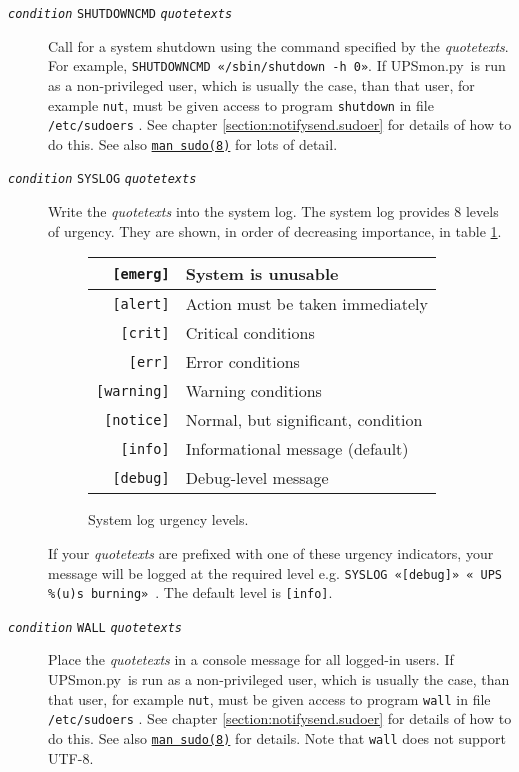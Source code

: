 \documentclass[12pt]{article}
\newcommand{\UPSmon}{\mbox{\textcolor{UPSMONCOLOUR}{UPSmon.py}}}
\newcommand{\ttit}[1]{\texttt{\textit{#1}}}
\newcommand{\LINman}[2]{\href{https://man7.org/linux/man-pages/man#2/#1.#2.html}{\texttt{man #1(#2)}}}
\begin{document}
\begin{description}
\begin{description}
\item[\ttit{condition} \texttt{SHUTDOWNCMD}
  \ttit{quotetexts}] \hspace{7mm} Call for a system shutdown using the
  command specified by the \textit{quotetexts}.  For example,
  \texttt{SHUTDOWNCMD «/sbin/shutdown -h 0»}. If \UPSmon\ is run as a
  non-privileged user, which is usually the case, than that user, for example
  \texttt{nut}, must be given access to program \texttt{shutdown} in file
  \texttt{/etc/sudoers} .  See chapter \ref{section:notifysend.sudoer} for
  details of how to do this.  See also \LINman{sudo}{8} for lots of detail.

\item[\ttit{condition} \texttt{SYSLOG} \ttit{quotetexts}] \hspace{7mm}
  Write the \textit{quotetexts} into the system log.  The system log provides
  8 levels of urgency. They are shown, in order of decreasing importance, in
  table \ref{fig:syslog}.
\begin{figure}[ht]
\begin{center}
\begin{tabular}{|r|l|}
\hline
\texttt{[emerg]}   & System is unusable \\ \hline
\texttt{[alert]}   & Action must be taken immediately \\ \hline
\texttt{[crit]}    & Critical conditions \\ \hline
\texttt{[err]}     & Error conditions \\ \hline
\texttt{[warning]} & Warning conditions \\ \hline
\texttt{[notice]}  & Normal, but significant, condition \\ \hline
\texttt{[info]}    & Informational message (default)\\ \hline
\texttt{[debug]}   & Debug-level message \\ \hline
\end{tabular}
\caption{System log urgency levels.\label{fig:syslog}}
\end{center}
\end{figure}
If your \textit{quotetexts} are prefixed with one of these urgency indicators,
your message will be logged at the required level e.g. \texttt{SYSLOG
  «[debug]» « UPS \%(u)s burning»}\ .  The default level is \texttt{[info]}.

\item[\ttit{condition} \texttt{WALL} \ttit{quotetexts}] \hspace{7mm} Place
  the \textit{quotetexts} in a console message for all logged-in users.  If
  \UPSmon\ is run as a non-privileged user, which is usually the case, than
  that user, for example \texttt{nut}, must be given access to program
  \texttt{wall} in file \texttt{/etc/sudoers} .  See chapter
  \ref{section:notifysend.sudoer} for details of how to do this.  See also
  \LINman{sudo}{8} for details.  Note that \texttt{wall} does not support
  UTF-8.

\end{description}

\end{description}
\end{document}
